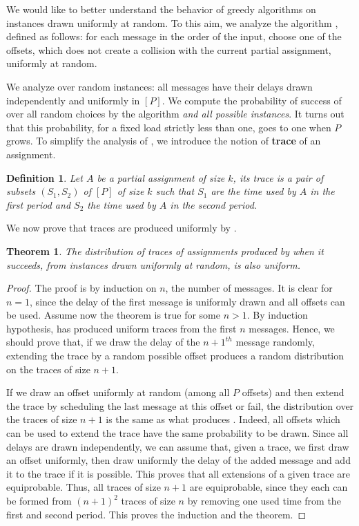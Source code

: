 \documentclass[pdflatex,sn-mathphys,iicol]{sn-jnl}%
\theoremstyle{thmstyleone}%
\newtheorem{theorem}{Theorem}%
\theoremstyle{thmstyletwo}%
\theoremstyle{thmstylethree}%
\newtheorem{definition}{Definition}%
\begin{document}
We would like to better understand the behavior of greedy algorithms on instances drawn uniformly at random. To this aim, we analyze the algorithm \greedyuniform, defined as follows: for each message in the order of the input, choose one of the offsets, which does not create a collision with the current partial assignment, uniformly at random. 

We analyze \greedyuniform over random instances:  all messages have their delays drawn independently and uniformly in $[P]$. We compute the probability of success of \greedyuniform over all random choices by the algorithm \emph{and all possible instances}. 
It turns out that this probability, for a fixed load strictly less than one, goes to one when $P$ grows. To simplify the analysis of \greedyuniform, we introduce the notion of \textbf{trace} of an assignment. 

\begin{definition}
Let $A$ be a partial assignment of size $k$, its trace is a pair of subsets $(S_1,S_2)$ of $[P]$ of size $k$ such that $S_1$ are the time used by $A$ in the first period and $S_2$ the time used by $A$ in the second period.
\end{definition}

 We now prove that traces are produced uniformly by \greedyuniform.

\begin{theorem}\label{theorem:uniform}
The distribution of traces of assignments produced by \greedyuniform when it succeeds, from instances drawn uniformly at random, is also uniform.
\end{theorem}
\begin{proof}
The proof is by induction on $n$, the number of messages. It is clear for $n=1$,
since the delay of the first message is uniformly drawn and all offsets can be used.
Assume now the theorem is true for some $n>1$. By induction hypothesis, \greedyuniform has produced
uniform traces from the first $n$ messages. Hence, we should prove that, if we draw the delay
of the $n+1^{th}$ message randomly, extending the trace by a random possible offset produces a random distribution on the traces of size $n+1$. 

 If we draw an offset uniformly at random (among all $P$ offsets) and then extend the trace by scheduling the last message at this offset or fail, the distribution over the traces of size $n+1$ is the same as what produces \greedyuniform. Indeed, all offsets which can be used to extend the trace have the same probability to be drawn. Since all delays are drawn independently, we can assume that, given a trace, we first draw an offset uniformly, then draw uniformly the delay of the added message and add it to the trace if it is possible. This proves that all extensions of a given trace are equiprobable. Thus, all traces of size $n+1$ are equiprobable, since they each can be formed from $(n+1)^2$ traces of size $n$ by removing one used time from the first and second period. This proves the induction and the theorem.
\end{proof}
\end{document}
